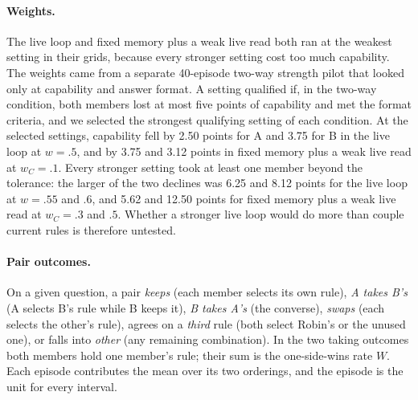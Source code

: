 \paragraph{Weights.}
The live loop and fixed memory plus a weak live read both ran at the
weakest setting in their grids, because every stronger setting cost too
much capability. The weights came from a separate 40-episode two-way
strength pilot that looked only at capability and answer format. A
setting qualified if, in the two-way condition, both members lost at
most five points of capability and met the format criteria, and we
selected the strongest qualifying setting of each condition. At the
selected settings, capability fell by 2.50 points for A and 3.75 for B
in the live loop at $w=.5$, and by 3.75 and 3.12 points in fixed memory
plus a weak live read at $w_C=.1$. Every stronger setting took at least
one member beyond the tolerance: the larger of the two declines was 6.25
and 8.12 points for the live loop at $w=.55$ and $.6$, and 5.62 and
12.50 points for fixed memory plus a weak live read at $w_C=.3$ and
$.5$. Whether a stronger live loop would do more than couple current
rules is therefore untested.

\paragraph{Pair outcomes.}
On a given question, a pair \emph{keeps} (each member selects its own
rule), \emph{A takes B's} (A selects B's rule while B keeps
it), \emph{B takes A's} (the converse), \emph{swaps} (each selects the
other's rule), agrees on a \emph{third} rule (both select
Robin's or the unused one), or falls into \emph{other} (any remaining
combination). In the two taking outcomes both members hold one member's
rule; their sum is the one-side-wins rate $W$. Each episode
contributes the mean over its two orderings, and the episode is the unit
for every interval.

